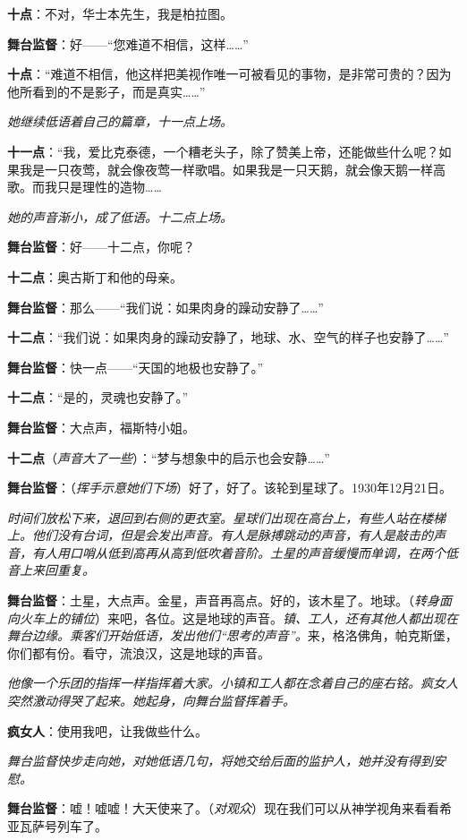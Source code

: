 \documentclass[lang=cn,newtx,12pt,scheme=chinese]{elegantbook}
\begin{document}
\textbf{十点}：不对，华士本先生，我是柏拉图。

\textbf{舞台监督}：好——“您难道不相信，这样……”

\textbf{十点}：“难道不相信，他这样把美视作唯一可被看见的事物，是非常可贵的？因为他所看到的不是影子，而是真实……”

\textit{她继续低语着自己的篇章，十一点上场。}


\textbf{十一点}：“我，爱比克泰德，一个糟老头子，除了赞美上帝，还能做些什么呢？如果我是一只夜莺，就会像夜莺一样歌唱。如果我是一只天鹅，就会像天鹅一样高歌。而我只是理性的造物……

\textit{她的声音渐小，成了低语。十二点上场。}

\textbf{舞台监督}：好——十二点，你呢？

\textbf{十二点}：奥古斯丁和他的母亲。

\textbf{舞台监督}：那么——“我们说：如果肉身的躁动安静了……”

\textbf{十二点}：“我们说：如果肉身的躁动安静了，地球、水、空气的样子也安静了……”

\textbf{舞台监督}：快一点——“天国的地极也安静了。”

\textbf{十二点}：“是的，灵魂也安静了。”

\textbf{舞台监督}：大点声，福斯特小姐。

\textbf{十二点}（\textit{声音大了一些}）：“梦与想象中的启示也会安静……”

\textbf{舞台监督}：（\textit{挥手示意她们下场}）好了，好了。该轮到星球了。1930年12月21日。

\textit{时间们放松下来，退回到右侧的更衣室。星球们出现在高台上，有些人站在楼梯上。他们没有台词，但是会发出声音。有人是脉搏跳动的声音，有人是敲击的声音，有人用口哨从低到高再从高到低吹着音阶。土星的声音缓慢而单调，在两个低音上来回重复。}

\textbf{舞台监督}：土星，大点声。金星，声音再高点。好的，该木星了。地球。（\textit{转身面向火车上的铺位}）来吧，各位。这是地球的声音。\textit{镇、工人，还有其他人都出现在舞台边缘。乘客们开始低语，发出他们“思考的声音”。}来，格洛佛角，帕克斯堡，你们都有份。看守，流浪汉，这是地球的声音。

\textit{他像一个乐团的指挥一样指挥着大家。小镇和工人都在念着自己的座右铭。疯女人突然激动得哭了起来。她起身，向舞台监督挥着手。}

\textbf{疯女人}：使用我吧，让我做些什么。

\textit{舞台监督快步走向她，对她低语几句，将她交给后面的监护人，她并没有得到安慰。}

\textbf{舞台监督}：嘘！嘘嘘！大天使来了。（\textit{对观众}）现在我们可以从神学视角来看看希亚瓦萨号列车了。
\end{document}

